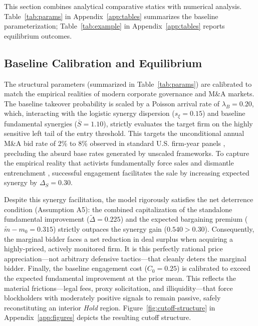 \documentclass[11pt]{article}
\newcommand{\1}{\mathbf{1}}
\begin{document}
This section combines analytical comparative statics with numerical analysis. Table~\ref{tab:params} in Appendix~\ref{app:tables} summarizes the baseline parameterization; Table~\ref{tab:example} in Appendix~\ref{app:tables} reports equilibrium outcomes.

%
\subsection{Baseline Calibration and Equilibrium}
%

The structural parameters (summarized in Table~\ref{tab:params}) are calibrated to match the empirical realities of modern corporate governance and M\&A markets. The baseline takeover probability is scaled by a Poisson arrival rate of $\lambda_B = 0.20$, which, interacting with the logistic synergy dispersion ($s_\xi = 0.15$) and baseline fundamental synergies ($\bar{S} = 1.10$), strictly evaluates the target firm on the highly sensitive left tail of the entry threshold. This targets the unconditional annual M\&A bid rate of 2\% to 8\% observed in standard U.S. firm-year panels \citep{BettonEckboThorburn2008}, precluding the absurd base rates generated by unscaled frameworks. To capture the empirical reality that activists fundamentally force sales and dismantle entrenchment \citep{GreenwoodSchor2009}, successful engagement facilitates the sale by increasing expected synergy by $\Delta_S = 0.30$.

Despite this synergy facilitation, the model rigorously satisfies the net deterrence condition (Assumption A5): the combined capitalization of the standalone fundamental improvement ($\tilde{\Delta} = 0.225$) and the expected bargaining premium ($\tilde{m}-m_0 = 0.315$) strictly outpaces the synergy gain ($0.540 > 0.30$). Consequently, the marginal bidder faces a net reduction in deal surplus when acquiring a highly-priced, actively monitored firm. It is this perfectly rational price appreciation---not arbitrary defensive tactics---that cleanly deters the marginal bidder. Finally, the baseline engagement cost ($C_0 = 0.25$) is calibrated to exceed the expected fundamental improvement at the prior mean. This reflects the material frictions---legal fees, proxy solicitation, and illiquidity---that force blockholders with moderately positive signals to remain passive, safely reconstituting an interior \textit{Hold} region. Figure~\ref{fig:cutoff-structure} in Appendix~\ref{app:figures} depicts the resulting cutoff structure.
\end{document}
